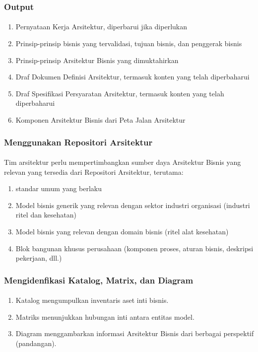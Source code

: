 \documentclass[aspectratio=169, table]{beamer}
\begin{document}
	
	\begin{frame}
		\frametitle{Output}
		\framesubtitle{\hspace{1cm}}
		\begin{enumerate}
			\item Pernyataan Kerja Arsitektur, diperbarui jika diperlukan
			\item Prinsip-prinsip bisnis yang tervalidasi, tujuan bisnis, dan penggerak bisnis
			\item Prinsip-prinsip Arsitektur Bisnis yang dimuktahirkan
			\item Draf Dokumen Definisi Arsitektur, termasuk konten yang telah diperbaharui 
			\item Draf Spesifikasi Persyaratan Arsitektur, termasuk konten yang telah diperbaharui 
			\item Komponen Arsitektur Bisnis dari Peta Jalan Arsitektur 
		\end{enumerate}
	\end{frame}
	
	\begin{frame}
		\frametitle{Menggunakan Repositori Arsitektur}
		\framesubtitle{\hspace{1cm}}
		Tim arsitektur perlu mempertimbangkan sumber daya Arsitektur Bisnis yang relevan yang tersedia dari Repositori Arsitektur, terutama:
		\begin{enumerate}
			\item standar umum yang berlaku
			\item Model bisnis generik yang relevan dengan sektor industri organisasi (industri ritel dan kesehatan)
			\item Model bisnis yang relevan dengan domain bisnis (ritel alat kesehatan)
			\item Blok bangunan khusus perusahaan (komponen proses, aturan bisnis, deskripsi pekerjaan, dll.)
			
		\end{enumerate}
	\end{frame}
	
	
	\begin{frame}
		\frametitle{Mengidenfikasi Katalog, Matrix, dan Diagram}
		\framesubtitle{\hspace{1cm}}
		\begin{enumerate}
			\item Katalog mengumpulkan inventaris aset inti bisnis. 
			\item Matriks menunjukkan hubungan inti antara entitas model. 
			\item Diagram menggambarkan informasi Arsitektur Bisnis dari berbagai perspektif (pandangan).
		\end{enumerate}
	\end{frame}	
	
\end{document}
